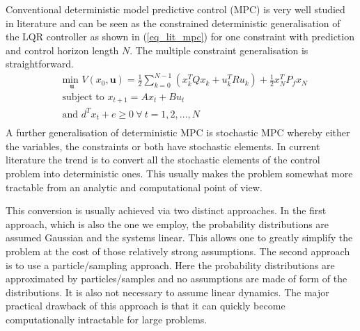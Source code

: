 Conventional deterministic model predictive control (MPC) is very well studied in literature \cite{raw} and can be seen as the constrained deterministic generalisation of the LQR controller as shown in (\ref{eq_lit_mpc}) for one constraint with prediction and control horizon length $N$. The multiple constraint generalisation is straightforward.
\begin{equation}
\begin{aligned}
&\underset{\mathbf{u}}{\text{min }} V(x_0, \mathbf{u}) = \frac{1}{2}\sum_{k=0}^{N-1} \left( x_k^TQx_k + u_k^TRu_k \right) + \frac{1}{2}x_N^TP_fx_N \\
& \text{subject to } x_{t+1} = Ax_t+Bu_t \\
& \text{and } d^Tx_t + e \geq 0 ~\forall~t=1, 2,...,N \\
\end{aligned}
\label{eq_lit_mpc}
\end{equation}
A further generalisation of deterministic MPC is stochastic MPC whereby either the variables, the constraints or both have stochastic elements. In current literature the trend is to convert all the stochastic elements of the control problem into deterministic ones. This usually makes the problem somewhat more tractable from an analytic and computational point of view.

This conversion is usually achieved via two distinct approaches. In the first approach, which is also the one we employ, the probability distributions are assumed Gaussian and the systems linear. This allows one to greatly simplify the problem at the cost of those relatively strong assumptions. The second approach is to use a particle/sampling approach. Here the probability distributions are approximated by particles/samples and no assumptions are made of form of the distributions. It is also not necessary to assume linear dynamics. The major practical drawback of this approach is that it can quickly become computationally intractable for large problems.

